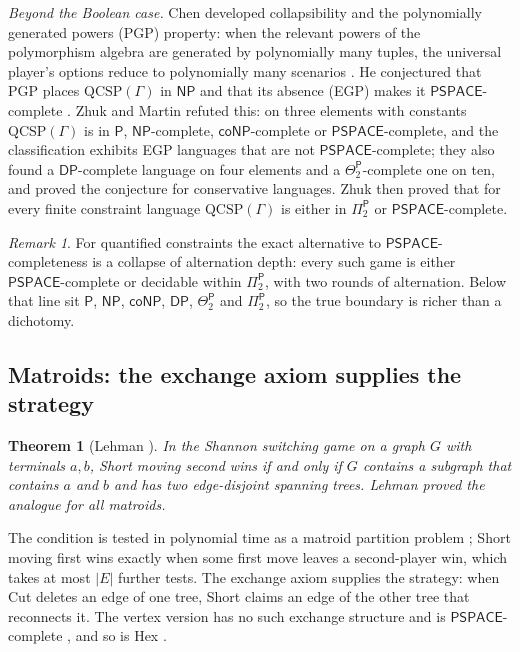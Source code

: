 \documentclass[11pt]{amsart}
\theoremstyle{plain}
\newtheorem{theorem}{Theorem}[section]
\theoremstyle{definition}
\theoremstyle{remark}
\newtheorem*{remark*}{Remark}
\numberwithin{equation}{section}
\newcommand{\cls}[1]{\mathsf{#1}}
\newcommand{\PSPACE}{\cls{PSPACE}}
\newcommand{\NP}{\cls{NP}}
\newcommand{\coNP}{\cls{coNP}}
\newcommand{\Pclass}{\cls{P}}
\begin{document}
\noindent\emph{Beyond the Boolean case.} Chen developed collapsibility and the polynomially generated powers (PGP) property: when the relevant powers of the polymorphism algebra are generated by polynomially many tuples, the universal player's options reduce to polynomially many scenarios \cite{Chen08,Chen11}. He conjectured that PGP places $\mathrm{QCSP}(\Gamma)$ in $\NP$ and that its absence (EGP) makes it $\PSPACE$-complete \cite{Chen12}. Zhuk and Martin \cite{ZhukMartin} refuted this: on three elements with constants $\mathrm{QCSP}(\Gamma)$ is in $\Pclass$, $\NP$-complete, $\coNP$-complete or $\PSPACE$-complete, and the classification exhibits EGP languages that are not $\PSPACE$-complete; they also found a $\mathsf{DP}$-complete language on four elements and a $\Theta_2^{\Pclass}$-complete one on ten, and proved the conjecture for conservative languages. Zhuk \cite{Zhuk24} then proved that for every finite constraint language $\mathrm{QCSP}(\Gamma)$ is either in $\Pi_2^{\Pclass}$ or $\PSPACE$-complete.

\begin{remark*}
For quantified constraints the exact alternative to $\PSPACE$-completeness is a collapse of alternation depth: every such game is either $\PSPACE$-complete or decidable within $\Pi_2^{\Pclass}$, with two rounds of alternation. Below that line sit $\Pclass$, $\NP$, $\coNP$, $\mathsf{DP}$, $\Theta_2^{\Pclass}$ and $\Pi_2^{\Pclass}$, so the true boundary is richer than a dichotomy.
\end{remark*}

\subsection{Matroids: the exchange axiom supplies the strategy}\label{ssec:matroid}
\begin{theorem}[Lehman \cite{Lehman}]\label{thm:lehman}
In the Shannon switching game on a graph $G$ with terminals $a,b$, Short moving second wins if and only if $G$ contains a subgraph that contains $a$ and $b$ and has two edge-disjoint spanning trees. Lehman proved the analogue for all matroids.
\end{theorem}
The condition is tested in polynomial time as a matroid partition problem \cite{EdmondsPartition}; Short moving first wins exactly when some first move leaves a second-player win, which takes at most $|E|$ further tests. The exchange axiom supplies the strategy: when Cut deletes an edge of one tree, Short claims an edge of the other tree that reconnects it. The vertex version has no such exchange structure and is $\PSPACE$-complete \cite{EvenTarjan}, and so is Hex \cite{Reisch}.
\end{document}
